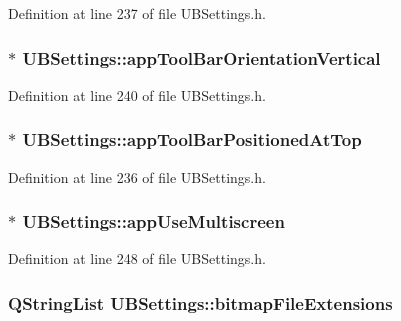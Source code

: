 Definition at line 237 of file U\-B\-Settings.\-h.

\hypertarget{class_u_b_settings_aee5ac1a9d519a121417130531130b778}{
\subsubsection[{app\-Tool\-Bar\-Orientation\-Vertical}]{$\ast$ U\-B\-Settings\-::app\-Tool\-Bar\-Orientation\-Vertical}}\label{db/d66/class_u_b_settings_aee5ac1a9d519a121417130531130b778}


Definition at line 240 of file U\-B\-Settings.\-h.

\hypertarget{class_u_b_settings_a656b93c011fa689b6b7abfa699857145}{
\subsubsection[{app\-Tool\-Bar\-Positioned\-At\-Top}]{$\ast$ U\-B\-Settings\-::app\-Tool\-Bar\-Positioned\-At\-Top}}\label{db/d66/class_u_b_settings_a656b93c011fa689b6b7abfa699857145}


Definition at line 236 of file U\-B\-Settings.\-h.

\hypertarget{class_u_b_settings_a5ca43f0a662f527bf32637439c602747}{
\subsubsection[{app\-Use\-Multiscreen}]{$\ast$ U\-B\-Settings\-::app\-Use\-Multiscreen}}\label{db/d66/class_u_b_settings_a5ca43f0a662f527bf32637439c602747}


Definition at line 248 of file U\-B\-Settings.\-h.

\hypertarget{class_u_b_settings_a3bb19bc8a412a4ec2fbf693a28aba52d}{
\subsubsection[{bitmap\-File\-Extensions}]{\setlength{\rightskip}{0pt plus 5cm}Q\-String\-List U\-B\-Settings\-::bitmap\-File\-Extensions\hspace{0.3cm}{\ttfamily [static]}}}\label{db/d66/class_u_b_settings_a3bb19bc8a412a4ec2fbf693a28aba52d}


